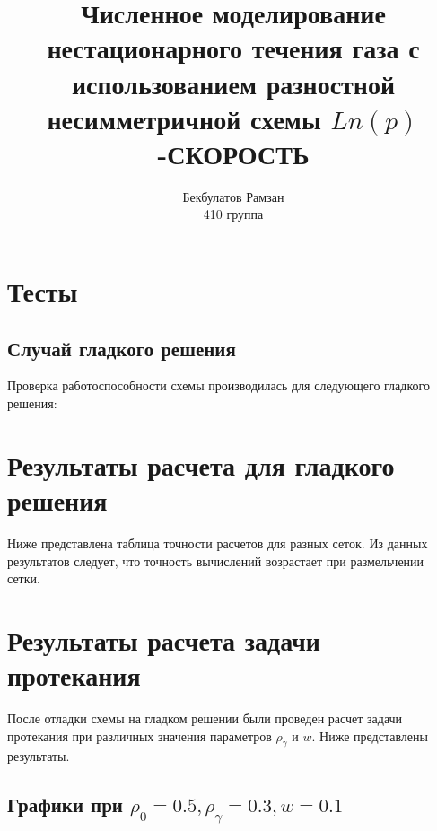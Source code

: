 \documentclass[12pt,a4paper]{article}
\begin{document}
\title{Численное моделирование нестационарного течения газа с 
использованием разностной несимметричной схемы $Ln(p)$-СКОРОСТЬ}
\author{Бекбулатов Рамзан \\ 410 группа }

\maketitle

\section{\LARGE Тесты}

\subsection{ \Large Случай гладкого решения}
Проверка работоспособности схемы производилась для следующего гладкого решения:

\begin{figure}[h]
\end{figure}




\section{Результаты расчета для гладкого решения}

Ниже представлена таблица точности расчетов для разных сеток. Из данных результатов следует, что точность вычислений 
возрастает при размельчении сетки.




\section{Результаты расчета задачи протекания}
После отладки схемы на гладком решении были проведен расчет задачи протекания при различных значения параметров $\rho_{\gamma}$ и $w$. Ниже представлены результаты.

\subsection{Графики при $\rho_{0} = 0.5, \rho_{\gamma} = 0.3, w = 0.1$}

\end{document}
